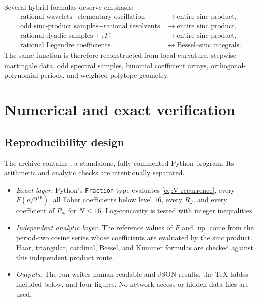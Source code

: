 \documentclass[11pt,oneside]{article}
\theoremstyle{definition}
\theoremstyle{remark}
\newcommand{\Up}{\operatorname{up}}
\newcommand{\1}{\mathbf 1}
\begin{document}
Several hybrid formulas deserve emphasis:
\begin{align}
 \text{rational wavelets}+\text{elementary oscillation}
 &\longrightarrow \text{entire sinc product},            \label{eq:hybrid1}\\
 \text{odd sinc-product samples}+\text{rational resolvents}
 &\longrightarrow \text{entire sinc product},            \label{eq:hybrid2}\\
 \text{rational dyadic samples}+{}_1F_1
 &\longrightarrow \text{entire sinc product},            \label{eq:hybrid3}\\
 \text{rational Legendre coefficients}
 &\longleftrightarrow \text{Bessel--sinc integrals}.       \label{eq:hybrid4}
\end{align}
The same function is therefore reconstructed from local curvature, stepwise
martingale data, odd spectral samples, binomial coefficient arrays,
orthogonal-polynomial periods, and weighted-polytope geometry.

\section{Numerical and exact verification}
\label{sec:numerics}

\subsection{Reproducibility design}

The archive contains
, a standalone, fully commented
Python program.  Its arithmetic and analytic checks are intentionally
separated.

\begin{itemize}
\item \emph{Exact layer.}  Python's \texttt{Fraction} type evaluates
      \eqref{eq:V-recurrence}, every $F(a/2^{16})$, all Faber coefficients
      below level $16$, every $R_J$, and every coefficient of $P_N$ for
      $N\le16$.  Log-concavity is tested with integer inequalities.
\item \emph{Independent analytic layer.}  The reference values of $F$ and
      $\Up$ come from the period-two cosine series whose coefficients are
      evaluated by the sinc product.  Haar, triangular, cardinal, Bessel, and
      Kummer formulas are checked against this independent product route.
\item \emph{Outputs.}  The run writes human-readable and JSON results, the
      TeX tables included below, and four figures.  No network access or
      hidden data files are used.
\end{itemize}
\end{document}
